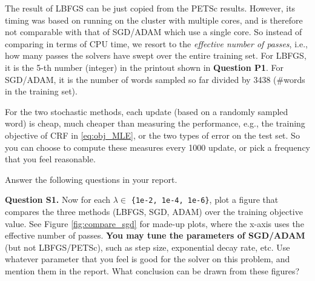 \documentclass[11pt]{report}
\begin{document}
The result of LBFGS can be just copied from the PETSc results.
However, its timing was based on running on the cluster with multiple cores,
and is therefore not comparable with that of SGD/ADAM which use a single core.
So instead of comparing in terms of CPU time, 
we resort to the \emph{effective number of passes}, 
i.e., how many passes the solvers have swept over the entire training set.
For LBFGS, it is the 5-th number (integer) in the printout shown in {\bf Question P1}.
For SGD/ADAM, it is the number of words sampled so far divided by 3438
(\#words in the training set).

For the two stochastic methods, each update (based on a randomly sampled word) is cheap, 
much cheaper than measuring the performance,
e.g., the training objective of CRF in \eqref{eq:obj_MLE}, or the two types of error on the test set.
So you can choose to compute these measures every 1000 update, 
or pick a frequency that you feel reasonable.



Answer the following questions in your report.

{\bf Question S1.}
%
Now for each $\lambda \in$ \verb!{1e-2, 1e-4, 1e-6}!,
plot a figure that compares the three methods (LBFGS, SGD, ADAM) over the training objective value.
See Figure \ref{fig:compare_sgd} for made-up plots,
where the x-axis uses the effective number of passes.
{\bf You may tune the parameters of SGD/ADAM} (but not LBFGS/PETSc),
such as step size, exponential decay rate, etc.
Use whatever parameter that you feel is good for the solver on this problem,
and mention them in the report.
What conclusion can be drawn from these figures?
\end{document}
